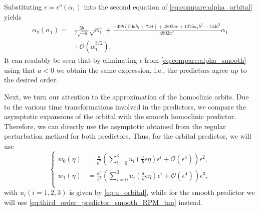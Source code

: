 Substituting $\epsilon=\epsilon^o(\alpha_1)$ into the second equation of
\cref{eq:compare:alpha_orbital} yields
\begin{align*}
    \alpha_2(\alpha_1) ={}& \frac{5b}{7\sqrt{-a}} \sqrt{\alpha_1}
    + \frac{-49 b (50 a b_1+73 d)+4802 a e+1225 a_1 b^2-144 b^3}{4802 a^2} \alpha_1 \\ 
                          & + \mathcal{O}(\alpha_1^{3/2}).
\end{align*}
It can readably be seen that by eliminating $\epsilon$ from
\cref{eq:compare:alpha_smooth} using that $a<0$ we obtain the same expression,
i.e., the predictors agree up to the desired order.

Next, we turn our attention to the approximation of the homoclinic orbits. Due
to the various time transformations involved in the predictors, we compare the
asymptotic expansions of the orbital with the smooth homoclinic predictor.
Therefore, we can directly use the asymptotic obtained from the regular
perturbation method for both predictors. Thus, for the orbital predictor,
we will use 
\begin{equation}
   \label{eq:w0_w1_eta}
   \left\{
   \begin{aligned}
       w_0(\eta)  &= \frac{a}{b^2} \left( \sum_{i=0}^3 u_i(\frac{a}{b}\epsilon\eta) \epsilon^i +
       \mathcal{O}(\epsilon^4) \right)   \epsilon^2, \\
       w_1(\eta)  &= \frac{a^2}{b^3} \left( \sum_{i=0}^3 \dot u_i(\frac{a}{b}\epsilon\eta) \epsilon^i +
       \mathcal{O}(\epsilon^4) \right)   \epsilon^3, \\
   \end{aligned} 
   \right.
\end{equation}
with $u_i(i=1,2,3)$ is given by \cref{eq:u_orbital}, while for the smooth
predictor we will use \cref{eq:third_order_predictor_smooth_RPM_tau} instead.

